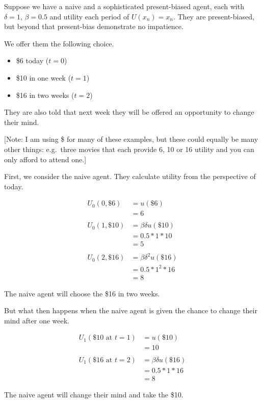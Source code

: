 \documentclass[
  letterpaper,
  DIV=11,
  numbers=noendperiod]{scrreprt}
\begin{document}
Suppose we have a naive and a sophisticated present-biased agent, each
with \(\delta=1\), \(\beta=0.5\) and utility each period of
\(U(x_n)=x_n\). They are present-biased, but beyond that present-bias
demonstrate no impatience.

We offer them the following choice.

\begin{itemize}
\item
  \$6 today (\(t=0\))
\item
  \$10 in one week (\(t=1\))
\item
  \$16 in two weeks (\(t=2\))
\end{itemize}

They are also told that next week they will be offered an opportunity to
change their mind.

{[}Note: I am using \$ for many of these examples, but these could
equally be many other things: e.g.~three movies that each provide 6, 10
or 16 utility and you can only afford to attend one.{]}

First, we consider the naive agent. They calculate utility from the
perspective of today.

\begin{align*}
U_0(0,\$6)&=u(\$6) \\
&=6 \\
\\
U_0(1,\$10)&=\beta\delta u(\$10) \\
&=0.5*1*10 \\
&=5 \\
\\
U_0(2,\$16)&=\beta\delta^2 u(\$16) \\
&=0.5*1^2*16 \\
&=8
\end{align*}

The naive agent will choose the \$16 in two weeks.

But what then happens when the naive agent is given the chance to change
their mind after one week.

\begin{align*}
U_1(\$10 \text{ at }t=1)&=u(\$10) \\
&=10 \\
\\
U_1(\$16 \text{ at }t=2)&=\beta\delta u(\$16) \\
&=0.5*1*16 \\
&=8
\end{align*}

The naive agent will change their mind and take the \$10.
\end{document}
